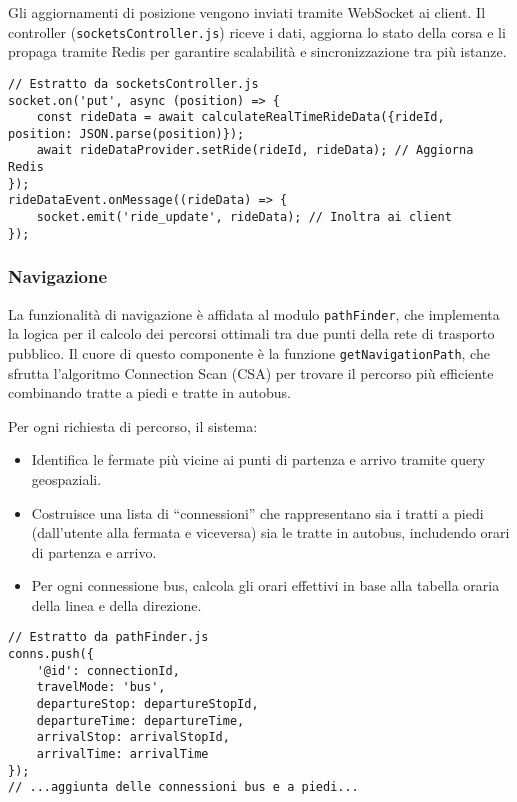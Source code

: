 Gli aggiornamenti di posizione vengono inviati tramite WebSocket ai client. Il controller (\texttt{socketsController.js}) riceve i dati, aggiorna lo stato della corsa e li propaga tramite Redis per garantire scalabilità e sincronizzazione tra più istanze.

\begin{lstlisting}
// Estratto da socketsController.js
socket.on('put', async (position) => {
    const rideData = await calculateRealTimeRideData({rideId, position: JSON.parse(position)});
    await rideDataProvider.setRide(rideId, rideData); // Aggiorna Redis
});
rideDataEvent.onMessage((rideData) => {
    socket.emit('ride_update', rideData); // Inoltra ai client
});
\end{lstlisting}

\subsubsection{Navigazione}

La funzionalità di navigazione è affidata al modulo \texttt{pathFinder}, che implementa la logica per il calcolo dei percorsi ottimali tra due punti della rete di trasporto pubblico. Il cuore di questo componente è la funzione \texttt{getNavigationPath}, che sfrutta l’algoritmo Connection Scan (CSA) per trovare il percorso più efficiente combinando tratte a piedi e tratte in autobus.

Per ogni richiesta di percorso, il sistema:
\begin{itemize}
    \item Identifica le fermate più vicine ai punti di partenza e arrivo tramite query geospaziali.
    \item Costruisce una lista di “connessioni” che rappresentano sia i tratti a piedi (dall’utente alla fermata e viceversa) sia le tratte in autobus, includendo orari di partenza e arrivo.
    \item Per ogni connessione bus, calcola gli orari effettivi in base alla tabella oraria della linea e della direzione.
\end{itemize}

\begin{lstlisting}
// Estratto da pathFinder.js
conns.push({
    '@id': connectionId,
    travelMode: 'bus',
    departureStop: departureStopId,
    departureTime: departureTime,
    arrivalStop: arrivalStopId,
    arrivalTime: arrivalTime
});
// ...aggiunta delle connessioni bus e a piedi...
\end{lstlisting}

